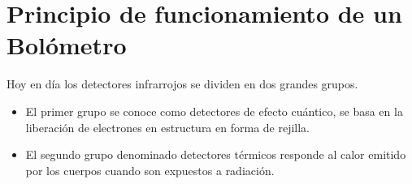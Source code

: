 \documentclass[a4paper,journal]{IEEEtran}
\begin{document}
\section{Principio de funcionamiento de un Bolómetro}
Hoy en día los detectores infrarrojos se dividen en dos grandes grupos.
\begin{itemize}
  \item El primer grupo se conoce como detectores de efecto cuántico, se basa en la liberación de electrones en estructura en forma de rejilla. 
  \item El segundo grupo denominado detectores térmicos responde al calor emitido por los cuerpos cuando son expuestos a radiación. 
\end{itemize}
\end{document}
